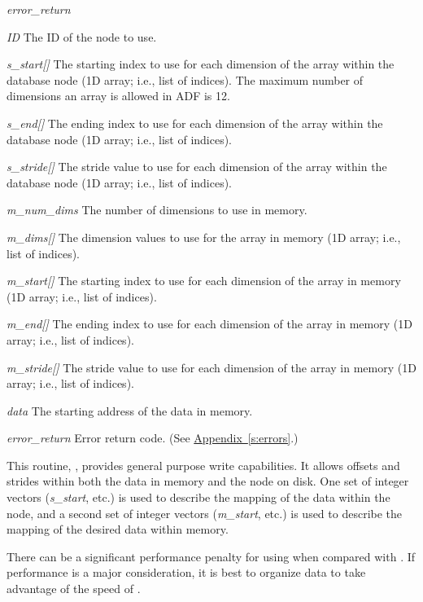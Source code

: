 \begin{Ventryi}{\textit{error\_return}}
\item[\textit{ID}]
     The ID of the node to use.
\item[\textit{s\_start[]}]
     The starting index to use for each dimension of the array within
     the database node (1D array; i.e., list of indices).
     The maximum number of dimensions an array is allowed in ADF is 12.
\item[\textit{s\_end[]}]
     The ending index to use for each dimension of the array within
     the database node (1D array; i.e., list of indices).
\item[\textit{s\_stride[]}]
     The stride value to use for each dimension of the array within
     the database node (1D array; i.e., list of indices).
\item[\textit{m\_num\_dims}]
     The number of dimensions to use in memory.
\item[\textit{m\_dims[]}]
     The dimension values to use for the array in memory (1D array;
     i.e., list of indices).
\item[\textit{m\_start[]}]
     The starting index to use for each dimension of the array in
     memory (1D array; i.e., list of indices).
\item[\textit{m\_end[]}]
     The ending index to use for each dimension of the array in
     memory (1D array; i.e., list of indices).
\item[\textit{m\_stride[]}]
     The stride value to use for each dimension of the array in
     memory (1D array; i.e., list of indices).
\item[\textit{data}]
     The starting address of the data in memory.
\item[\textit{error\_return}]
     Error return code.
     (See \hyperref[s:errors]{Appendix~\ref*{s:errors}}.)
\end{Ventryi}

This routine, , provides general purpose write
capabilities.
It allows offsets and strides within both the data in memory and the
node on disk.
One set of integer vectors (\textit{s\_start}, etc.) is used to
describe the mapping of the data within the node, and a second set of
integer vectors (\textit{m\_start}, etc.) is used to describe the
mapping of the desired data within memory.

There can be a significant performance penalty for using
 when compared with
\hyperlink{sub:Write\_All\_Data}{}.
If performance is a major consideration, it is best to organize
data to take advantage of the speed of .

